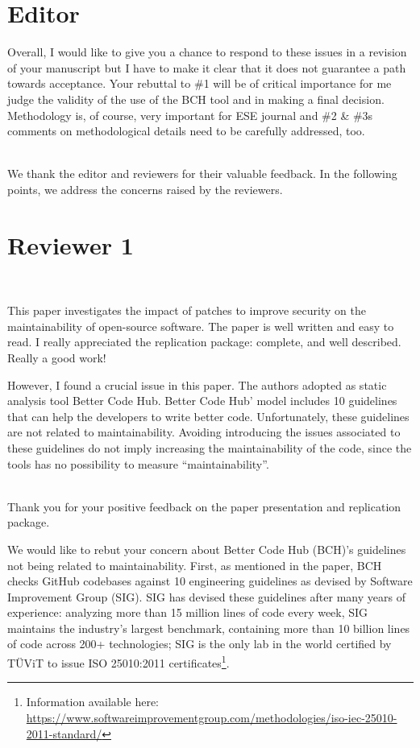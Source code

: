 \documentclass[11pt,fleqn]{article}
\title{\vspace*{-2cm}{\bf Authors' Response to the Review of
 EMSE-D-20-00300:\\
 ``Fixing Vulnerabilities Potentially Hinders Maintainability''}}
\author{Sofia Reis, Rui Abreu, Luis Cruz}
\date{}
\newcommand{\eline}{\vspace*{.75\baselineskip}}
\newcommand{\Referee}[1]{\eline \noindent {\bf Reviewer comment #1:} \\}
\newcommand{\Us}{\eline \noindent {\bf Response:}\\}
\newcommand{\newreviewer}[1]{\section*{Reviewer #1}\vspace*{-1.05\baselineskip}}
\newcommand{\editor}[1]{\section*{Editor #1}\vspace*{-1.05\baselineskip}}
\newenvironment{revcomment}[1][]
{\Referee{#1}\begin{rcomment}}
{\end{rcomment}}
\newenvironment{reveditor}
{\begin{rcomment}}
{\end{rcomment}}
\begin{document}
\maketitle

\editor{}

\begin{reveditor}
    Overall, I would like to give you a chance to respond to 
    these issues in a revision of your manuscript but I have 
    to make it clear that it does not guarantee a path towards 
    acceptance. Your rebuttal to \#1 will be of critical importance 
    for me judge the validity of the use of the BCH tool and in 
    making a final decision. Methodology is, of course, very 
    important for ESE journal and \#2 \& \#3s comments on methodological 
    details need to be carefully addressed, too. 
\end{reveditor}

\Us We thank the editor and reviewers for their valuable feedback. In the 
following points, we address the concerns raised by the reviewers.

\newreviewer{1}

\begin{revcomment}[1.1]

    This paper investigates the impact of patches to improve 
    security on the maintainability of open-source software. 
    The paper is well written and easy to read. I really 
    appreciated the replication package: complete, and well 
    described. Really a good work!
    
    However, I found a crucial issue in this paper. The authors 
    adopted as static analysis tool Better Code Hub. Better Code 
    Hub' model includes 10 guidelines that can help the developers to 
    write better code. Unfortunately, these guidelines are not related 
    to maintainability. Avoiding introducing the issues associated to 
    these guidelines do not imply increasing the maintainability of the 
    code, since the tools has no possibility to measure ``maintainability''.

\end{revcomment}

\Us Thank you for your positive feedback on the paper presentation and replication
package. 

We would like to rebut your concern about Better Code Hub (BCH)'s guidelines not 
being related to maintainability. First, as mentioned in the paper, BCH checks GitHub 
codebases against 10 engineering guidelines as devised by Software Improvement Group 
(SIG). SIG has devised these guidelines after many years of experience: analyzing more 
than 15 million lines of code every week, SIG maintains the industry’s largest 
benchmark, containing more than 10 billion lines of code across 200+ technologies; SIG 
is the only lab in the world certified by TÜViT to issue ISO 25010:2011 
certificates\footnote{Information available here: 
\url{https://www.softwareimprovementgroup.com/methodologies/iso-iec-25010-2011-standard/}}.
\end{document}
